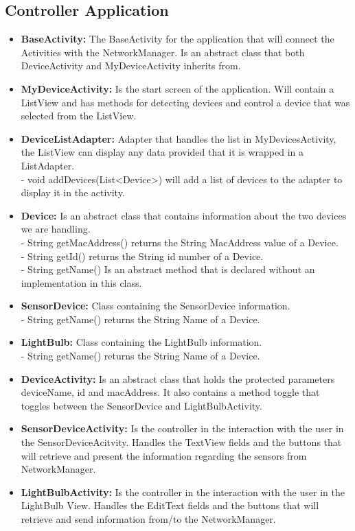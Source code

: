 \documentclass[a4paper]{article}
\begin{document}
	\subsection{Controller Application}
	\begin{itemize}
		\item{\textbf{BaseActivity:}} 
		The BaseActivity for the application that will connect the Activities with the NetworkManager. Is an abstract class that both DeviceActivity and MyDeviceActivity inherits from.
		\item{\textbf{MyDeviceActivity:}} 
		Is the start screen of the application. Will contain a ListView and has methods for detecting devices and control a device that was selected from the ListView.
		\item{\textbf{DeviceListAdapter:}} 
		Adapter that handles the list in MyDevicesActivity, the ListView can display any data provided that it is wrapped in a ListAdapter.\\ 
        - void addDevices(List<Device>) will add a list of devices to the adapter to display it in the activity.
		\item{\textbf{Device:}} 
		Is an abstract class that contains information about the two devices we are handling. \\
        - String getMacAddress() returns the String MacAddress value of a Device.\\
        - String getId() returns the String id number of a Device.\\
        - String getName() Is an abstract method that is declared without an implementation in this class.
		\item{\textbf{SensorDevice:}} 
		Class containing the SensorDevice information.\\
        - String getName() returns the String Name of a Device.
		\item{\textbf{LightBulb:}}
		Class containing the LightBulb information.\\
        - String getName() returns the String Name of a Device.
		\item{\textbf{DeviceActivity:}} 
		Is an abstract class that holds the protected parameters deviceName, id and macAddress. It also contains a method toggle that toggles between the SensorDevice and LightBulbActivity.
		\item{\textbf{SensorDeviceActivity:}} 
		Is the controller in the interaction with the user in the SensorDeviceAcitvity. Handles the TextView fields and the buttons that will retrieve and present the information regarding the sensors from NetworkManager.
		\item{\textbf{LightBulbActivity:}} 
		Is the controller in the interaction with the user in the LightBulb View. Handles the EditText fields and the buttons that will retrieve and send information from/to the NetworkManager.
		

\end{itemize}
\end{document}
